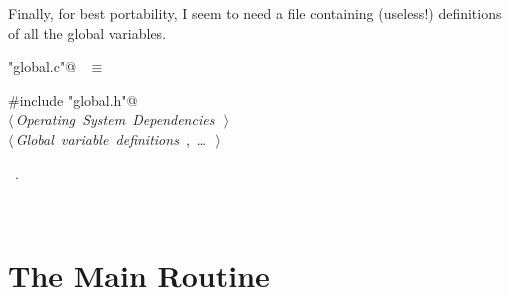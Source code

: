\documentclass{report}
\begin{document}
Finally, for best portability, I seem to need a file containing
(useless!) definitions of all the global variables.
\begin{flushleft} \small
\begin{minipage}{\linewidth} \label{scrap13}
\verb@"global.c"@\nobreak\ {\footnotesize {} }$\equiv$
\vspace{-1ex}
\begin{list}{}{} \item
\mbox{}\verb@#include "global.h"@\\
\mbox{}\verb@@\hbox{$\langle\,${\it Operating System Dependencies}\nobreak\ {\footnotesize {}}$\,\rangle$}\verb@@\\
\mbox{}\verb@@\hbox{$\langle\,${\it Global variable definitions}\nobreak\ {\footnotesize {}, \ldots\ }$\,\rangle$}\verb@@\\
\mbox{}\verb@@{\NWsep}
\end{list}
\vspace{-1ex}
\footnotesize\addtolength{\baselineskip}{-1ex}
\begin{list}{}{\setlength{\itemsep}{-\parsep}\setlength{\itemindent}{-\leftmargin}}
\item \NWtxtFileDefBy\ .
\end{list}
\end{minipage}\\[4ex]
\end{flushleft}
\section{The Main Routine} \label{main-routine}
\end{document}
